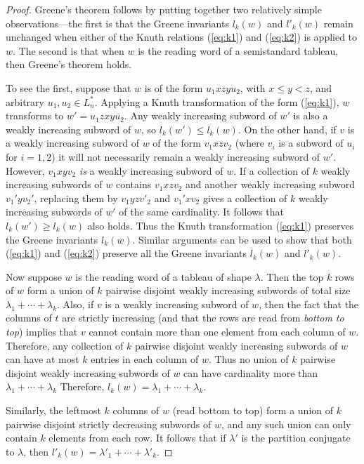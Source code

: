 \documentclass[11pt]{amsproc}
\theoremstyle{definition}
\theoremstyle{example}
\begin{document}
\begin{proof}
  Greene's theorem follows by putting together two relatively simple observations---the first is that the Greene invariants $l_k(w)$ and $l'_k(w)$ remain unchanged when either of the Knuth relations (\ref{eq:k1}) and (\ref{eq:k2}) is applied to $w$.
  The second is that when $w$ is the reading word of a semistandard tableau, then Greene's theorem holds.

  To see the first, suppose that $w$ is of the form $u_1xzyu_2$, with $x\leq y < z$, and arbitrary $u_1,u_2\in L_n^*$.
  Applying a Knuth transformation of the form (\ref{eq:k1}), $w$ transforms to $w'=u_1zxyu_2$.
  Any weakly increasing subword of $w'$ is also a weakly increasing subword of $w$, so $l_k(w')\leq l_k(w)$.
  On the other hand, if $v$ is a weakly increasing subword of $w$ of the form $v_1xzv_2$ (where $v_i$ is a subword of $u_i$ for $i=1,2$) it will not necessarily remain a weakly increasing subword of $w'$.
  However, $v_1xyv_2$ \emph{is} a weakly increasing subword of $w$.
  If a collection of $k$ weakly increasing subwords of $w$ contains $v_1xzv_2$ and another weakly increasing subword $v_1'yv_2'$, replacing them by $v_1yzv'_2$ and  $v_1'xv_2$ gives a collection of $k$ weakly increasing subwords of $w'$ of the same cardinality.
  It follows that $l_k(w')\geq l_k(w)$ also holds.
  Thus the Knuth transformation (\ref{eq:k1}) preserves the Greene invariants $l_k(w)$.
  Similar arguments can be used to show that both (\ref{eq:k1}) and (\ref{eq:k2}) preserve all the Greene invariants $l_k(w)$ and $l'_k(w)$.

  Now suppose $w$ is the reading word of a tableau of shape $\lambda$.
  Then the top $k$ rows of $w$ form a union of $k$ pairwise disjoint weakly increasing subwords of total size $\lambda_1+\dotsb+\lambda_k$.
  Also, if $v$ is a weakly increasing subword of $w$, then the fact that the columns of $t$ are strictly increasing (and that the rows are read from \emph{bottom to top}) implies that $v$ cannot contain more than one element from each column of $w$.
  Therefore, any collection of $k$ pairwise disjoint weakly increasing subwords of $w$ can have at most $k$ entries in each column of $w$.
  Thus no union of $k$ pairwise disjoint weakly increasing subwords of $w$ can have cardinality more than $\lambda_1+\dotsb+\lambda_k$
  Therefore, $l_k(w)=\lambda_1+\dotsb+\lambda_k$.

  Similarly, the leftmost $k$ columns of $w$ (read bottom to top) form a union of $k$ pairwise disjoint strictly decreasing subwords of $w$, and any such union can only contain $k$ elements from each row.
  It follows that if $\lambda'$ is the partition conjugate to $\lambda$, then $l'_k(w)=\lambda'_1+\dotsb + \lambda'_k$.
\end{proof}
\end{document}
